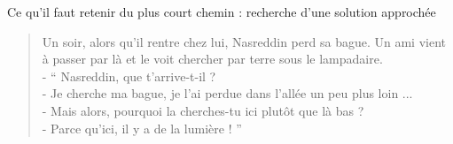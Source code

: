 \begin{frame}{Ce qu'il faut retenir du plus court chemin : recherche d'une solution approchée}
  \bigskip 

  \begin{verse}
    Un soir, alors qu'il rentre chez lui, Nasreddin perd sa bague. Un ami vient à passer par là et le voit chercher par terre sous le lampadaire. \\
    - `` Nasreddin, que t'arrive-t-il ?\\
    - Je cherche ma bague, je l'ai perdue dans l'allée un peu plus loin ...\\
    - Mais alors, pourquoi la cherches-tu ici plutôt que là bas ?\\
    - Parce qu'ici, il y a de la lumière ! ''
  \end{verse}



\end{frame}
